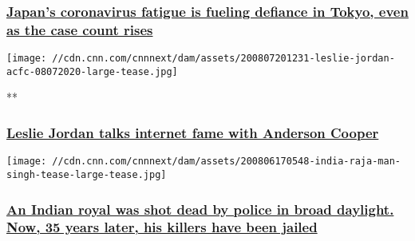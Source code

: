 \hypertarget{japans-coronavirus-fatigue-is-fueling-defiance-in-tokyo-even-as-the-case-count-rises-2}{%
\subsubsection{\texorpdfstring{\href{/2020/08/07/asia/tokyo-coronavirus-fatigue-intl-hnk/index.html}{Japan's
coronavirus fatigue is fueling defiance in Tokyo, even as the case count
rises}}{Japan's coronavirus fatigue is fueling defiance in Tokyo, even as the case count rises}}\label{japans-coronavirus-fatigue-is-fueling-defiance-in-tokyo-even-as-the-case-count-rises-2}}

\href{/videos/us/2020/08/07/leslie-jordan-quarantine-acfc-full-episode-vpx.cnn}{}

\texttt{[image: //cdn.cnn.com/cnnnext/dam/assets/200807201231-leslie-jordan-acfc-08072020-large-tease.jpg]}

**

\hypertarget{leslie-jordan-talks-internet-fame-with-anderson-cooper}{%
\subsubsection{\texorpdfstring{\href{/videos/us/2020/08/07/leslie-jordan-quarantine-acfc-full-episode-vpx.cnn}{Leslie
Jordan talks internet fame with Anderson
Cooper}}{Leslie Jordan talks internet fame with Anderson Cooper}}\label{leslie-jordan-talks-internet-fame-with-anderson-cooper}}

\href{/2020/08/07/asia/india-maharaja-police-sentence-intl-dst-hnk/index.html}{}

\texttt{[image: //cdn.cnn.com/cnnnext/dam/assets/200806170548-india-raja-man-singh-tease-large-tease.jpg]}

\hypertarget{an-indian-royal-was-shot-dead-by-police-in-broad-daylight-now-35-years-later-his-killers-have-been-jailed}{%
\subsubsection{\texorpdfstring{\href{/2020/08/07/asia/india-maharaja-police-sentence-intl-dst-hnk/index.html}{An
Indian royal was shot dead by police in broad daylight. Now, 35 years
later, his killers have been
jailed}}{An Indian royal was shot dead by police in broad daylight. Now, 35 years later, his killers have been jailed}}\label{an-indian-royal-was-shot-dead-by-police-in-broad-daylight-now-35-years-later-his-killers-have-been-jailed}}

\href{/2020/08/07/world/beirut-explosion-baby-birth-trnd/index.html}{}

